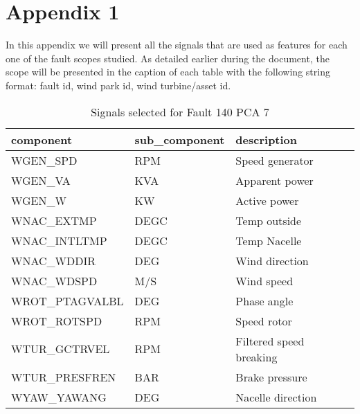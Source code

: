 

\chapter{Appendix 1}
\label{appendix1}

In this appendix we will present all the signals that are used as features for each one of the fault scopes studied. As detailed earlier during the document, the scope will be presented in the caption of each table with the following string format: fault id, wind park id, wind turbine/asset id.

\begin{table}[h!t]
    \centering
    \begin{tabular}{|l|l|l|}
    \hline
        component & sub\_component & description \\ \hline
        WGEN\_SPD & RPM & Speed generator \\ \hline
        WGEN\_VA & KVA & Apparent power \\ \hline
        WGEN\_W & KW & Active power \\ \hline
        WNAC\_EXTMP & DEGC & Temp outside \\ \hline
        WNAC\_INTLTMP & DEGC & Temp Nacelle \\ \hline
        WNAC\_WDDIR & DEG & Wind direction \\ \hline
        WNAC\_WDSPD & M/S & Wind speed \\ \hline
        WROT\_PTAGVALBL & DEG & Phase angle \\ \hline
        WROT\_ROTSPD & RPM & Speed rotor \\ \hline
        WTUR\_GCTRVEL & RPM & Filtered speed breaking \\ \hline
        WTUR\_PRESFREN & BAR & Brake pressure \\ \hline
        WYAW\_YAWANG & DEG & Nacelle direction \\ \hline
    \end{tabular}
    \caption{Signals selected for Fault 140 PCA 7}
\end{table}

